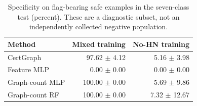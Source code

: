 \begin{table}[t]
\centering
\caption{Specificity on flag-bearing safe examples in the seven-class test (percent). These are a diagnostic subset, not an independently collected negative population.}
\label{tab:hn}
\footnotesize
\begin{tabular}{lrr}
\toprule
Method & Mixed training & No-HN training \\
\midrule
CertGraph & 97.62 $\pm$ 4.12 & 5.16 $\pm$ 3.98 \\
Feature MLP & 0.00 $\pm$ 0.00 & 0.00 $\pm$ 0.00 \\
Graph-count MLP & 100.00 $\pm$ 0.00 & 5.69 $\pm$ 9.86 \\
Graph-count RF & 100.00 $\pm$ 0.00 & 7.32 $\pm$ 12.67 \\
\bottomrule
\end{tabular}
\end{table}

